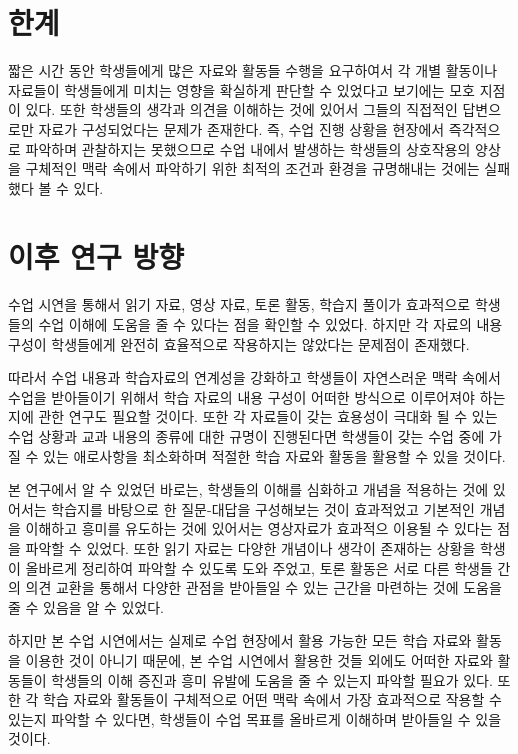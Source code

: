 \documentclass[10pt, a4paper, chapter]{oblivoir}
\begin{document}
    \section{한계}

    짧은 시간 동안 학생들에게 많은 자료와 활동들 수행을 요구하여서 각 개별 활동이나 자료들이 
    학생들에게 미치는 영향을 확실하게 판단할 수 있었다고 보기에는 모호 지점이 있다. 또한 학생들의 
    생각과 의견을 이해하는 것에 있어서 그들의 직접적인 답변으로만 자료가 구성되었다는 문제가 존재한다. 즉, 수업 진행 상황을 현장에서 즉각적으로 파악하며 
    관찰하지는 못했으므로 수업 내에서 발생하는 학생들의 상호작용의 양상을 구체적인 맥락 속에서 파악하기 위한 최적의 조건과 환경을 규명해내는 것에는 실패했다 볼 수 있다. 

    \section{이후 연구 방향}
    
    수업 시연을 통해서 읽기 자료, 영상 자료, 토론 활동, 학습지 풀이가 효과적으로 학생들의 수업 이해에
    도움을 줄 수 있다는 점을 확인할 수 있었다. 하지만 각 자료의 내용 구성이 학생들에게 완전히 효율적으로 작용하지는 않았다는 문제점이 존재했다. 

    따라서 수업 내용과 학습자료의 연계성을 강화하고 학생들이 자연스러운 맥락 속에서 수업을 받아들이기 위해서 학습 자료의 내용 구성이 
    어떠한 방식으로 이루어져야 하는지에 관한 연구도 필요할 것이다. 
    또한 각 자료들이 갖는 효용성이 극대화 될 수 있는 수업 상황과 교과 내용의 종류에 대한 규명이 진행된다면
    학생들이 갖는 수업 중에 가질 수 있는 애로사항을 최소화하며 적절한 학습 자료와 활동을 활용할 수 있을 것이다. 

    본 연구에서 알 수 있었던 바로는, 학생들의 이해를 심화하고 개념을 적용하는 것에 있어서는 학습지를 바탕으로 한 질문-대답을 구성해보는 것이 효과적었고 기본적인 개념을 이해하고 흥미를 유도하는 것에 있어서는 영상자료가 효과적으 이용될 수 있다는 점을 파악할 수 있었다. 
    또한 읽기 자료는 다양한 개념이나 생각이 존재하는 상황을 학생이 올바르게 정리하여 파악할 수 있도록 도와 주었고, 토론 활동은 서로 다른 학생들 간의 의견 교환을 통해서 다양한 관점을 받아들일 수 있는 근간을 마련하는 것에 도움을 줄 수 있음을 알 수 있었다. 

    하지만 본 수업 시연에서는 실제로 수업 현장에서 활용 가능한 모든 학습 자료와 활동을 이용한 것이 아니기 때문에, 본 수업 시연에서 활용한 것들 외에도 어떠한 자료와 활동들이 학생들의 
    이해 증진과 흥미 유발에 도움을 줄 수 있는지 파악할 필요가 있다. 
    또한 각 학습 자료와 활동들이 구체적으로 어떤 맥락 속에서 가장 효과적으로 작용할 수 있는지 파악할 수 있다면, 학생들이 수업 목표를 올바르게 이해하며 받아들일 수 있을 것이다. \newline
\end{document}
